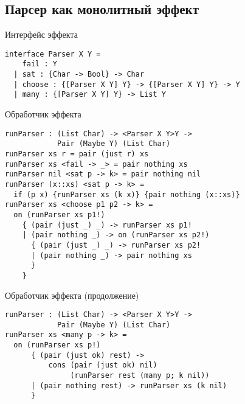 \subsection{Парсер как монолитный эффект}

\begin{frame}[fragile]{}
\begin{block}{Интерфейс эффекта}
\begin{verbatim}
interface Parser X Y =
    fail : Y
  | sat : {Char -> Bool} -> Char
  | choose : {[Parser X Y] Y} -> {[Parser X Y] Y} -> Y
  | many : {[Parser X Y] Y} -> List Y
\end{verbatim}
\end{block}
\end{frame}

\begin{frame}[fragile]{}
\begin{block}{Обработчик эффекта}
\begin{verbatim}
runParser : (List Char) -> <Parser X Y>Y ->
            Pair (Maybe Y) (List Char)
runParser xs r = pair (just r) xs
runParser xs <fail -> _> = pair nothing xs
runParser nil <sat p -> k> = pair nothing nil
runParser (x::xs) <sat p -> k> =
  if (p x) {runParser xs (k x)} {pair nothing (x::xs)}
runParser xs <choose p1 p2 -> k> =
  on (runParser xs p1!)
    { (pair (just _) _) -> runParser xs p1!
    | (pair nothing _) -> on (runParser xs p2!)
      { (pair (just _) _) -> runParser xs p2!
      | (pair nothing _) -> pair nothing xs
      }
    }
\end{verbatim}
\end{block}
\end{frame}

\begin{frame}[fragile]{}
\begin{block}{Обработчик эффекта (продолжение)}
\begin{verbatim}
runParser : (List Char) -> <Parser X Y>Y ->
            Pair (Maybe Y) (List Char)
runParser xs <many p -> k> =
  on (runParser xs p!)
      { (pair (just ok) rest) ->
          cons (pair (just ok) nil)
               (runParser rest (many p; k nil))
      | (pair nothing rest) -> runParser xs (k nil)
      }
\end{verbatim}
\end{block}
\end{frame}


